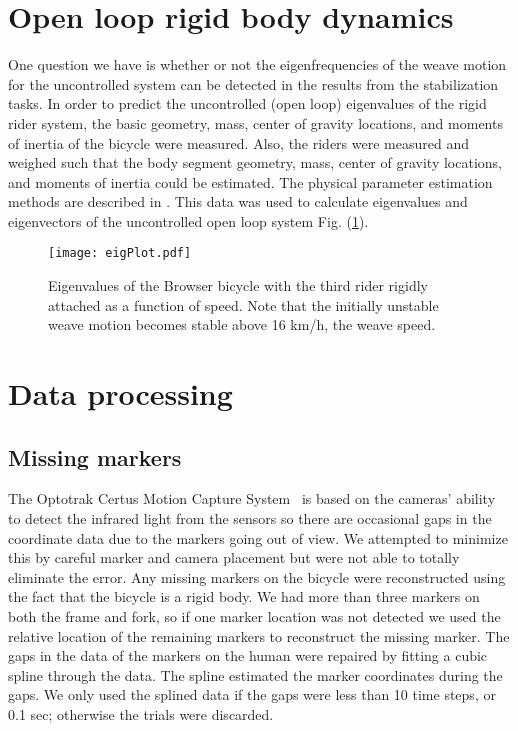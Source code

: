 \documentclass[smallextended]{svjour3}     %
\begin{document}
\section{Open loop rigid body dynamics}
\label{sec:openLoop}
One question we have is whether or not the eigenfrequencies of the weave motion
for the uncontrolled system can be detected in the results from the
stabilization tasks. In order to predict the uncontrolled (open loop)
eigenvalues of the rigid rider system, the basic geometry, mass, center of
gravity locations, and moments of inertia of the bicycle were measured. Also,
the riders were measured and weighed such that the body segment geometry, mass,
center of gravity locations, and moments of inertia could be estimated. The
physical parameter estimation methods are described in \cite{Moore2009a}. This
data was used to calculate eigenvalues and eigenvectors of the uncontrolled open loop system Fig.
(\ref{fig:eigPlot}).
\begin{figure}[tbp]
    \begin{center}
        \texttt{[image: eigPlot.pdf]}
    \end{center}
    \caption{Eigenvalues of the Browser bicycle with the third rider rigidly
    attached as a
    function of speed. Note that the initially unstable weave motion becomes
    stable above 16 km/h, the weave speed.}
    \label{fig:eigPlot}
\end{figure}

\section{Data processing}
\label{sec:data}

\subsection{Missing markers}
\label{sec:missingMarkers}
The Optotrak Certus Motion Capture
System~\cite{NorthernDigitalIncorporated2009} is based on the cameras' ability
to detect the infrared light from the sensors so there are occasional gaps in
the coordinate data due to the markers going out of view. We attempted to
minimize this by careful marker and camera placement but were not able to
totally eliminate the error. Any missing markers on the bicycle were
reconstructed using the fact that the bicycle is a rigid body. We had more than
three markers on both the frame and fork, so if one marker location was not
detected we used the relative location of the remaining markers to reconstruct
the missing marker. The gaps in the data of the markers on the human were
repaired by fitting a cubic spline through the data. The spline estimated the
marker coordinates during the gaps. We only used the splined data if the gaps
were less than 10 time steps, or 0.1 sec; otherwise the trials were discarded.
\end{document}

